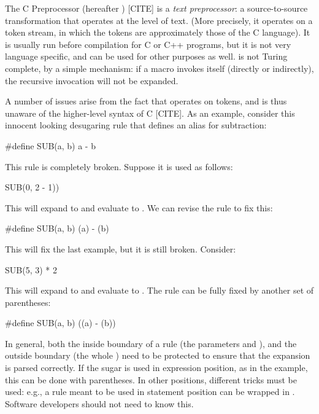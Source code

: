 The C Preprocessor (hereafter ) [CITE] is a \emph{text
  preprocessor}: a source-to-source transformation that operates at
the level of text. (More precisely, it operates on a token stream, in
which the tokens are approximately those of the C language). It is
usually run before compilation for C or C++ programs, but it is not
very language specific, and can be used for other purposes as well.
 is not Turing complete, by a simple mechanism: if a macro
invokes itself (directly or indirectly), the recursive invocation
will not be expanded.

A number of issues arise from the fact that  operates on tokens, and
is thus unaware of the higher-level syntax of C [CITE].
As an example, consider this innocent looking
 desugaring rule that defines an alias for subtraction:
\begin{Codes}
  #define SUB(a, b) a - b
\end{Codes}
This rule is completely broken. Suppose it is used as follows:
\begin{Codes}
  SUB(0, 2 - 1))
\end{Codes}
This will expand to  and evaluate to .
We can revise the rule to fix this:
\begin{Codes}
  #define SUB(a, b) (a) - (b)
\end{Codes}
This will fix the last example, but it is still broken. Consider:
\begin{Codes}
  SUB(5, 3) * 2
\end{Codes}
This will expand to  and evaluate to .
The rule can be fully fixed by another set of parentheses:
\begin{Codes}
  #define SUB(a, b) ((a) - (b))
\end{Codes}
In general, both the inside boundary of a rule (the parameters 
and ), and the outside boundary (the whole ) need
to be protected to ensure that the expansion is parsed correctly. If
the sugar is used in expression position, as in the 
example, this can be done with parentheses. In other positions,
different tricks must be used: e.g., a rule meant to be used in
statement position can be wrapped in .
Software developers should not need to know this. %

